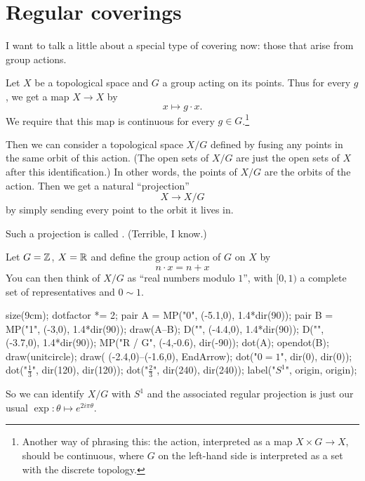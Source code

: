\section{Regular coverings}
I want to talk a little about a special type of covering now: those
that arise from group actions.

Let $X$ be a topological space and $G$ a group acting on its points.
Thus for every $g$, we get a map $X \to X$ by 
\[ x \mapsto g \cdot x. \]
We require that this map is continuous for every $g \in G$.\footnote{%
	Another way of phrasing this: the action,
	interpreted as a map $X \times G \to X$, should be continuous,
	where $G$ on the left-hand side is interpreted as a set with
	the discrete topology.}

Then we can consider a topological space $X/G$ defined by fusing any points
in the same orbit of this action.
(The open sets of $X/G$ are just the open sets of $X$ after this identification.)
In other words, the points of $X/G$ are the orbits of the action.
Then we get a natural ``projection''
\[ X \to X/G \]
by simply sending every point to the orbit it lives in.
\begin{definition}
	Such a projection is called .
	(Terrible, I know.)
\end{definition}

\begin{example}[$\RR \to S^1$ is regular]
	Let $G = \mathbb Z$, $X = \mathbb R$
	and define the group action of $G$ on $X$ by 
	\[ n \cdot x = n + x \]
	You can then think of $X/G$ as ``real numbers modulo $1$'',
	with $[0,1)$ a complete set of representatives and $0 \sim 1$.
	\begin{center}
		\begin{asy}
			size(9cm);
			dotfactor *= 2;
			pair A = MP("0", (-5.1,0), 1.4*dir(90));
			pair B = MP("1", (-3,0), 1.4*dir(90));
			draw(A--B);
			D("", (-4.4,0), 1.4*dir(90));
			D("", (-3.7,0), 1.4*dir(90));
			MP("\mathbb R / G", (-4,-0.6), dir(-90));
			dot(A); opendot(B);
			draw(unitcircle);
			draw( (-2.4,0)--(-1.6,0), EndArrow);
			dot("$0=1$", dir(0), dir(0));
			dot("$\frac13$", dir(120), dir(120));
			dot("$\frac23$", dir(240), dir(240));
			label("$S^1$", origin, origin);
		\end{asy}
	\end{center}
	So we can identify $X/G$ with $S^1$
	and the associated regular projection
	is just our usual $\exp : \theta \mapsto e^{2i\pi \theta}$.
\end{example}
	
